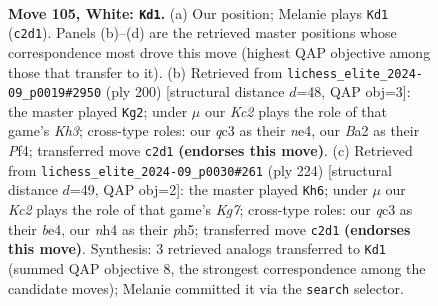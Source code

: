 \documentclass[11pt]{article}
\begin{document}
\begin{figure}[p]\centering
\begin{subfigure}{0.46\textwidth}\centering
\resizebox{\linewidth}{!}{%
\newchessgame
\chessboard[
  setfen={5k2/1Nn5/8/8/Pp2P2n/2q5/B1K2b1p/8 w - - 2 105},
  showmover=false,
  pgfstyle=straightmove, color=movearrow, markmove={c2-d1}
]}
\caption{}
\end{subfigure}\hfill
\begin{subfigure}{0.46\textwidth}\centering
\resizebox{\linewidth}{!}{%
\newchessgame
\chessboard[
  setfen={8/8/4n2p/B4p1k/2P1nP2/7K/8/8 w - - 12 101},
  showmover=false,
  pgfstyle=straightmove, color=movearrow, markmove={h3-g2}
]}
\caption{}
\end{subfigure}
\\[4pt]
\begin{subfigure}{0.46\textwidth}\centering
\resizebox{\linewidth}{!}{%
\newchessgame
\chessboard[
  setfen={8/3k2K1/pP4p1/7p/1B2bP1P/8/8/8 w - - 7 113},
  showmover=false,
  pgfstyle=straightmove, color=movearrow, markmove={g7-h6}
]}
\caption{}
\end{subfigure}\hfill

\caption{\textbf{Move 105, White: \texttt{Kd1}.} (a) Our position; Melanie plays \texttt{Kd1} (\texttt{c2d1}). Panels (b)--(d) are the retrieved master positions whose correspondence most drove this move (highest QAP objective among those that transfer to it). (b) Retrieved from \texttt{lichess\_elite\_2024-09\_p0019\#2950} (ply 200) [structural distance $d$=48, QAP obj=3]: the master played \texttt{Kg2}; under $\mu$ our \emph{Kc2} plays the role of that game's \emph{Kh3}; cross-type roles: our \emph{q}c3 as their \emph{n}e4, our \emph{B}a2 as their \emph{P}f4; transferred move \texttt{c2d1} \textbf{(endorses this move)}. (c) Retrieved from \texttt{lichess\_elite\_2024-09\_p0030\#261} (ply 224) [structural distance $d$=49, QAP obj=2]: the master played \texttt{Kh6}; under $\mu$ our \emph{Kc2} plays the role of that game's \emph{Kg7}; cross-type roles: our \emph{q}c3 as their \emph{b}e4, our \emph{n}h4 as their \emph{p}h5; transferred move \texttt{c2d1} \textbf{(endorses this move)}. Synthesis: 3 retrieved analogs transferred to \texttt{Kd1} (summed QAP objective 8, the strongest correspondence among the candidate moves); Melanie committed it via the \texttt{search} selector.}
\label{fig:thought-m208}
\end{figure}

\clearpage
\end{document}
